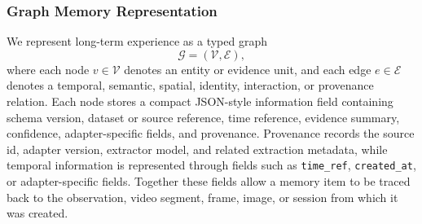 
\subsubsection{Graph Memory Representation}
\label{sec:memory_representation}

We represent long-term experience as a typed graph
\begin{equation}
    \mathcal{G} = (\mathcal{V}, \mathcal{E}),
\end{equation}
where each node $v \in \mathcal{V}$ denotes an entity or evidence unit, and each edge $e \in \mathcal{E}$ denotes a temporal, semantic, spatial, identity, interaction, or provenance relation.
Each node stores a compact JSON-style information field containing schema version, dataset or source reference, time reference, evidence summary, confidence, adapter-specific fields, and provenance.
Provenance records the source id, adapter version, extractor model, and related extraction metadata, while temporal information is represented through fields such as \texttt{time\_ref}, \texttt{created\_at}, or adapter-specific fields.
Together these fields allow a memory item to be traced back to the observation, video segment, frame, image, or session from which it was created.



